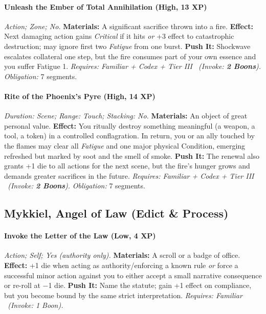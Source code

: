 \documentclass[12pt,twoside]{book}
\begin{document}
\paragraph{Unleash the Ember of Total Annihilation (High, 13 XP)} \emph{Action; Zone; No.}
\textbf{Materials:} A significant sacrifice thrown into a fire.
\textbf{Effect:} Next damaging action gains \emph{Critical} if it hits \emph{or} +3 effect to catastrophic destruction; may ignore first two \emph{Fatigue} from one burst.
\textbf{Push It:} Shockwave escalates collateral one step, but the fire consumes part of your own essence and you suffer Fatigue 1.
\emph{Requires: Familiar + Codex + Tier III \ (\textit{Invoke:} \textbf{2 Boons}).}
\emph{Obligation:} 7 segments.

\paragraph{Rite of the Phoenix's Pyre (High, 14 XP)} \emph{Duration: Scene; Range: Touch; Stacking: No.}
\textbf{Materials:} An object of great personal value.
\textbf{Effect:} You ritually destroy something meaningful (a weapon, a tool, a token) in a controlled conflagration. In return, you or an ally touched by the flames may clear all \emph{Fatigue} and one major physical Condition, emerging refreshed but marked by soot and the smell of smoke.
\textbf{Push It:} The renewal also grants +1 die to all actions for the next scene, but the fire's hunger grows and demands greater sacrifices in the future.
\emph{Requires: Familiar + Codex + Tier III \ (\textit{Invoke:} \textbf{2 Boons}).}
\emph{Obligation:} 7 segments.

\subsection{Mykkiel, Angel of Law (Edict \& Process)}
\paragraph{Invoke the Letter of the Law (Low, 4 XP)} \emph{Action; Self; Yes (authority only).}
\textbf{Materials:} A scroll or a badge of office.
\textbf{Effect:} +1 die when acting as authority/enforcing a known rule \emph{or} force a successful minor action against you to either accept a small narrative consequence or re-roll at −1 die.
\textbf{Push It:} Name the statute; gain +1 effect on compliance, but you become bound by the same strict interpretation.
\emph{Requires: Familiar \ (\textit{Invoke:} 1 Boon).}
\end{document}
